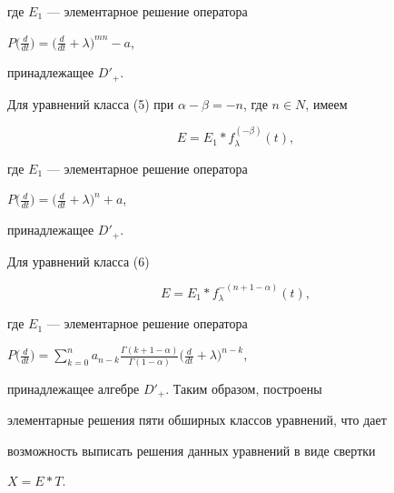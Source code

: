 где $E_1$ --- элементарное решение оператора


$P\big(\frac{d}{dt}\big)=\big(\frac{d}{dt}+\lambda\big)^{mn} - a$,


принадлежащее $D'_+$.


Для уравнений класса (5) при $\alpha- \beta=-n$, где $n\in N$, имеем


$$


E=E_1\ast f^{(-\beta )}_\lambda (t),


$$


где $E_1$ --- элементарное решение оператора


$P\big(\frac{d}{dt}\big)=\big(\frac{d}{dt}+\lambda\big)^{n} + a$,


принадлежащее $D'_+$.


Для уравнений класса (6)


$$


E=E_1\ast f^{-(n+1-\alpha)}_\lambda (t),


$$


где $E_1$ --- элементарное решение оператора


$P\big(\frac{d}{dt}\big)=\sum \limits_{k=0}^{n} a_{n-k}


\frac{\Gamma(k+1-\alpha)}{\Gamma(1-\alpha)}


\big(\frac{d}{dt}+\lambda\big)^{n-k}$,


принадлежащее алгебре $D'_+$. Таким образом, построены


элементарные решения пяти обширных классов уравнений, что дает


возможность выписать решения данных уравнений в виде свертки


$X=E\ast T$.








